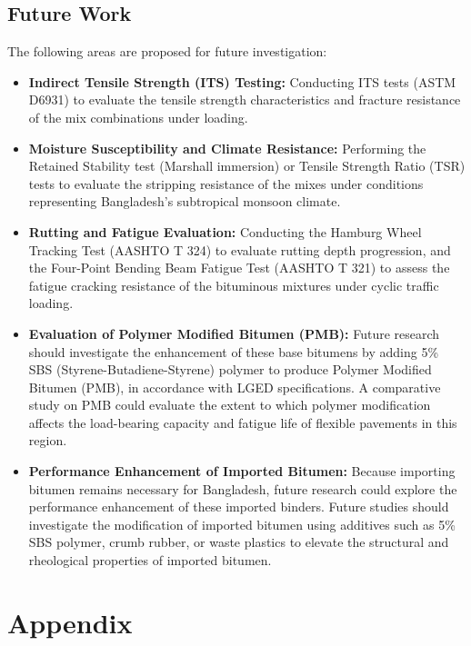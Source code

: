 \documentclass[12pt,a4paper]{article}
\begin{document}
\subsection{Future Work}
The following areas are proposed for future investigation:
\begin{itemize}
    \item \textbf{Indirect Tensile Strength (ITS) Testing:} Conducting ITS tests (ASTM D6931) to evaluate the tensile strength characteristics and fracture resistance of the mix combinations under loading.
    \item \textbf{Moisture Susceptibility and Climate Resistance:} Performing the Retained Stability test (Marshall immersion) or Tensile Strength Ratio (TSR) tests to evaluate the stripping resistance of the mixes under conditions representing Bangladesh's subtropical monsoon climate.
    \item \textbf{Rutting and Fatigue Evaluation:} Conducting the Hamburg Wheel Tracking Test (AASHTO T 324) to evaluate rutting depth progression, and the Four-Point Bending Beam Fatigue Test (AASHTO T 321) to assess the fatigue cracking resistance of the bituminous mixtures under cyclic traffic loading.
    \item \textbf{Evaluation of Polymer Modified Bitumen (PMB):} Future research should investigate the enhancement of these base bitumens by adding 5\% SBS (Styrene-Butadiene-Styrene) polymer to produce Polymer Modified Bitumen (PMB), in accordance with LGED specifications. A comparative study on PMB could evaluate the extent to which polymer modification affects the load-bearing capacity and fatigue life of flexible pavements in this region.
    \item \textbf{Performance Enhancement of Imported Bitumen:} Because importing bitumen remains necessary for Bangladesh, future research could explore the performance enhancement of these imported binders. Future studies should investigate the modification of imported bitumen using additives such as 5\% SBS polymer, crumb rubber, or waste plastics to elevate the structural and rheological properties of imported bitumen.
\end{itemize}

\clearpage
{}
{}



\clearpage
\section{Appendix}
\end{document}
